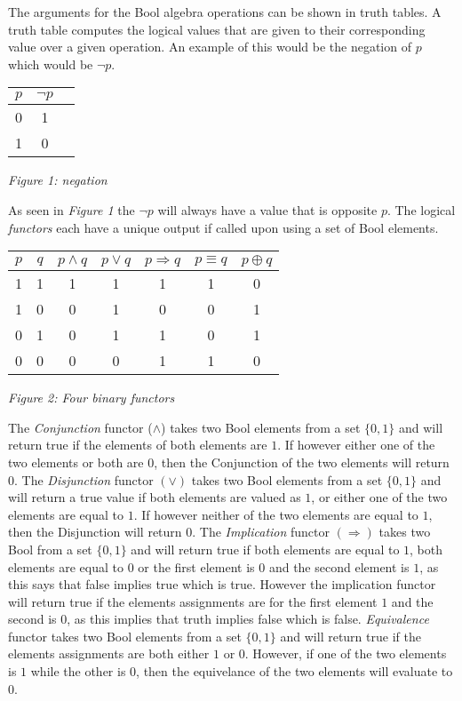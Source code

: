 \documentclass[11pt,a4paper]{report}
\begin{document}
The arguments for the Bool algebra operations can be shown in truth tables. A truth table computes the logical values that are given to their corresponding value over a given operation. An example of this would be the negation of $p$ which would be $\neg p$. 
\begin{center}
\begin{tabular}{|c|c|c|}
\hline
$p$ & $\neg p$\\ \hline
0 & 1 \\
1 & 0 \\ 
\hline
\end{tabular}  
\end{center}
\begin{center}
\emph{Figure 1: negation}
\end{center}
As seen in \emph{Figure 1} the $\neg p$ will always have a value that is opposite $p$.
The logical \emph{functors} each have a unique output if called upon using a set of Bool elements.
\begin{center}
\begin{tabular}{|c|c||c|c|c|c|c|}
\hline
$p$ & $q$ & $p \land q$ & $p \lor q$ & $p \Rightarrow q$ & $p \equiv q$ & $p \oplus q$		\\ \hline
1 & 1 & 1 & 1 & 1 & 1 & 0\\
1 & 0 & 0 & 1 & 0 & 0 & 1\\
0 & 1 & 0 & 1 & 1 & 0 & 1\\
0 & 0 & 0 & 0 & 1 & 1 & 0\\
\hline
\end{tabular}  
\end{center}
\begin{center}
\emph{Figure 2: Four binary functors}
\end{center}
The \emph{Conjunction} functor ($\land$) takes two Bool elements from a set $\{0,1\}$ and will return true if the elements of both elements are $1$. If however either one of the two elements or both are $0$, then the Conjunction of the two elements will return $0$. The \emph{Disjunction} functor $(\lor)$ takes two Bool elements from a set $\{0,1\}$ and will return a true value if both elements are valued as $1$, or either one of the two elements are equal to $1$. If however neither of the two elements are equal to $1$, then the Disjunction will return $0$. The \emph{Implication} functor $(\Rightarrow)$ takes two Bool from a set $\{0,1\}$ and will return true if both elements are equal to $1$, both elements are equal to $0$ or the first element is $0$ and the second element is $1$, as this says that false implies true which is true. However the implication functor will return true if the elements assignments are for the first element $1$ and the second is $0$, as this implies that truth implies false which is false. \emph{Equivalence} functor takes two Bool elements from a set $\{0,1\}$ and will return true if the elements assignments are both either $1$ or $0$. However, if one of the two elements is $1$ while the other is $0$, then the equivelance of the two elements will evaluate to $0$. 
\end{document}
